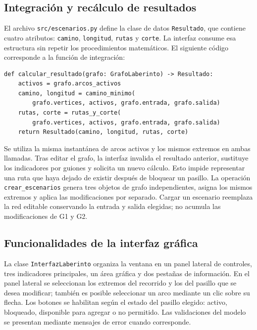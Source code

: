 \documentclass[11pt,a4paper]{article}
\begin{document}
\subsection{Integración y recálculo de resultados}
El archivo \texttt{src/escenarios.py} define la clase de datos \texttt{Resultado}, que contiene cuatro atributos: \texttt{camino}, \texttt{longitud}, \texttt{rutas} y \texttt{corte}. La interfaz consume esa estructura sin repetir los procedimientos matemáticos. El siguiente código corresponde a la función de integración:
\begin{lstlisting}
def calcular_resultado(grafo: GrafoLaberinto) -> Resultado:
    activos = grafo.arcos_activos
    camino, longitud = camino_minimo(
        grafo.vertices, activos, grafo.entrada, grafo.salida)
    rutas, corte = rutas_y_corte(
        grafo.vertices, activos, grafo.entrada, grafo.salida)
    return Resultado(camino, longitud, rutas, corte)
\end{lstlisting}
Se utiliza la misma instantánea de arcos activos y los mismos extremos en ambas llamadas. Tras editar el grafo, la interfaz invalida el resultado anterior, sustituye los indicadores por guiones y solicita un nuevo cálculo. Esto impide representar una ruta que haya dejado de existir después de bloquear un pasillo. La operación \texttt{crear\_escenarios} genera tres objetos de grafo independientes, asigna los mismos extremos y aplica las modificaciones por separado. Cargar un escenario reemplaza la red editable conservando la entrada y salida elegidas; no acumula las modificaciones de G1 y G2.

\subsection{Funcionalidades de la interfaz gráfica}
La clase \texttt{InterfazLaberinto} organiza la ventana en un panel lateral de controles, tres indicadores principales, un área gráfica y dos pestañas de información. En el panel lateral se seleccionan los extremos del recorrido y los del pasillo que se desea modificar; también es posible seleccionar un arco mediante un clic sobre su flecha. Los botones se habilitan según el estado del pasillo elegido: activo, bloqueado, disponible para agregar o no permitido. Las validaciones del modelo se presentan mediante mensajes de error cuando corresponde.
\end{document}
